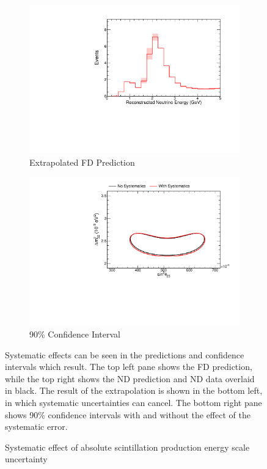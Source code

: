 {\begin{figure}
\begin{center}
\begin{subfigure}[c]{0.49\textwidth}
\includegraphics[width=\textwidth]{figures/systs/prediction/fd_extrap_prediction_birksScaleAbs.pdf}
\caption*{Extrapolated FD Prediction}
\end{subfigure}
\begin{subfigure}[c]{0.49\textwidth}
\includegraphics[width=\textwidth]{figures/systs/prediction/fd_extrap_contour_birksScaleAbs.pdf}
\caption*{90\% Confidence Interval}
\end{subfigure}
\end{center}
\caption{Systematic effect of absolute scintillation production energy scale uncertainty}{
Systematic effects can be seen in the predictions and confidence intervals
which result.
The top left pane shows the FD prediction, while the top right shows the
ND prediction and ND data overlaid in black.
The result of the extrapolation is shown in the bottom left, in which
systematic uncertainties can cancel.
The bottom right pane shows 90\% confidence intervals with and without
the effect of the systematic error.}
\label{syst_fig_birksScaleAbs}


\end{figure}}
